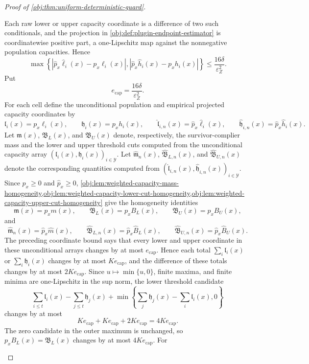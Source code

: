 \begin{proof}[Proof of \cref{obj:thm:uniform-deterministic-guard}]
\begin{enumerate}
Each raw lower or upper capacity coordinate is a difference of two such
conditionals, and the projection in \cref{obj:def:plugin-endpoint-estimator} is
coordinatewise positive part, a one-Lipschitz map against the nonnegative
population capacities.  Hence
\[
\max\left\{
\left|\widehat p_x\widehat\ell_i(x)-p_x\ell_i(x)\right|,
\left|\widehat p_x\widehat h_i(x)-p_xh_i(x)\right|
\right\}
\le
\frac{16\delta}{\varepsilon_Z^2}.
\]
Put
\[
e_{\mathrm{cap}}=\frac{16\delta}{\varepsilon_Z^2}.
\]
For each cell define the unconditional population and empirical projected
capacity coordinates by
\[
\mathfrak l_i(x)=p_x\ell_i(x),
\qquad
\mathfrak h_i(x)=p_xh_i(x),
\qquad
\widehat{\mathfrak l}_{i,n}(x)=\widehat p_x\widehat\ell_i(x),
\qquad
\widehat{\mathfrak h}_{i,n}(x)=\widehat p_x\widehat h_i(x).
\]
Let \(\mathfrak m(x)\), \(\mathfrak B_L(x)\), and \(\mathfrak B_U(x)\) denote,
respectively, the survivor-complier mass and the lower and upper threshold cuts
computed from the unconditional capacity array
\((\mathfrak l_i(x),\mathfrak h_i(x))_{i\in\mathcal Y}\).  Let
\(\widehat{\mathfrak m}_n(x)\), \(\widehat{\mathfrak B}_{L,n}(x)\), and
\(\widehat{\mathfrak B}_{U,n}(x)\) denote the corresponding quantities computed
from
\((\widehat{\mathfrak l}_{i,n}(x),\widehat{\mathfrak h}_{i,n}(x))_{i\in\mathcal Y}\).
Since \(p_x\ge0\) and \(\widehat p_x\ge0\),
\cref{obj:lem:weighted-capacity-mass-homogeneity,obj:lem:weighted-capacity-lower-cut-homogeneity,obj:lem:weighted-capacity-upper-cut-homogeneity}
give the homogeneity identities
\[
\mathfrak m(x)=p_xm(x),
\qquad
\mathfrak B_L(x)=p_xB_L(x),
\qquad
\mathfrak B_U(x)=p_xB_U(x),
\]
and
\[
\widehat{\mathfrak m}_n(x)=\widehat p_x\widehat m(x),
\qquad
\widehat{\mathfrak B}_{L,n}(x)=\widehat p_x\widehat B_L(x),
\qquad
\widehat{\mathfrak B}_{U,n}(x)=\widehat p_x\widehat B_U(x).
\]
The preceding coordinate bound says that every lower and upper coordinate in
these unconditional arrays changes by at most \(e_{\mathrm{cap}}\).  Hence each
total \(\sum_i\mathfrak l_i(x)\) or \(\sum_i\mathfrak h_i(x)\) changes by at most
\(Ke_{\mathrm{cap}}\), and the difference of these totals changes by at most
\(2Ke_{\mathrm{cap}}\).  Since \(u\mapsto \min\{u,0\}\), finite maxima, and
finite minima are one-Lipschitz in the sup norm, the lower threshold candidate
\[
\sum_{i\le t}\mathfrak l_i(x)-\sum_{j\le t}\mathfrak h_j(x)
+
\min\left\{\sum_j\mathfrak h_j(x)-\sum_i\mathfrak l_i(x),0\right\}
\]
changes by at most
\[
Ke_{\mathrm{cap}}+Ke_{\mathrm{cap}}+2Ke_{\mathrm{cap}}
=
4Ke_{\mathrm{cap}}.
\]
The zero candidate in the outer maximum is unchanged, so
\(p_xB_L(x)=\mathfrak B_L(x)\) changes by at most \(4Ke_{\mathrm{cap}}\).  For

\end{enumerate}
\end{proof}
